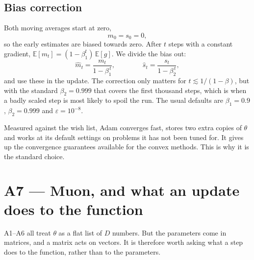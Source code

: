 \documentclass[11pt]{article}
\begin{document}
\subsection*{Bias correction}

Both moving averages start at zero,
%
\[
  m_{0} = s_{0} = 0,
\]
%
so the early estimates are biased towards zero. After $t$ steps with a constant gradient,
$\mathbb{E}[m_t] = (1-\beta_1^{t})\,\mathbb{E}[g]$. We divide the bias out:
%
\[
  \hat{m}_{t} = \frac{m_{t}}{1 - \beta_{1}^{\,t}},
  \qquad\qquad
  \hat{s}_{t} = \frac{s_{t}}{1 - \beta_{2}^{\,t}},
\]
%
and use these in the update. The correction only matters for $t \lesssim 1/(1-\beta)$,
but with the standard $\beta_{2} = 0.999$ that covers the first thousand steps, which is
when a badly scaled step is most likely to spoil the run. The usual defaults are
$\beta_{1} = 0.9$, $\beta_{2} = 0.999$ and $\varepsilon = 10^{-8}$.

\begin{keybox}
Measured against the wish list, Adam converges fast, stores two extra copies of $\theta$
and works at its default settings on problems it has not been tuned for. It gives up the
convergence guarantees available for the convex methods. This is why it is the standard
choice.
\end{keybox}

\section{A7 --- Muon, and what an update does to the function}
\label{sec:muon}

A1--A6 all treat $\theta$ as a flat list of $D$ numbers. But the parameters come in
matrices, and a matrix acts on vectors. It is therefore worth asking what a step does to
the function, rather than to the parameters.
\end{document}
